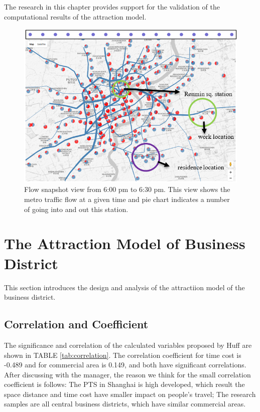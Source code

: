 \documentclass[journal,transmag]{IEEEtran}
\begin{document}
The research in this chapter provides support for the validation of the computational results of the attraction model.

\begin{figure}[tb]
\centering
\includegraphics[width=1\columnwidth]{figure5.png}
\caption{Flow snapshot view from 6:00 pm to 6:30 pm. This view shows the metro traffic flow at a given time and pie chart indicates a number of going into and out this station.}
\label{fig:Flow-view}
\end{figure}










\section{The Attraction Model of Business District}

This section introduces the design and analysis of the attractiion model of the business district.

\subsection{Correlation and Coefficient}

The significance and correlation of the calculated variables proposed by Huff are shown in TABLE \ref{tab:correlation}. The correlation coefficient for time cost is -0.489 and for commercial area is 0.149, and both have significant correlations. After discussing with the manager, the reason we think for the small correlation coefficient is follows: The PTS in Shanghai is high developed, which result the space distance and time cost have smaller impact on people's travel; The research samples are all central business districts, which have similar commercial areas.
\end{document}
